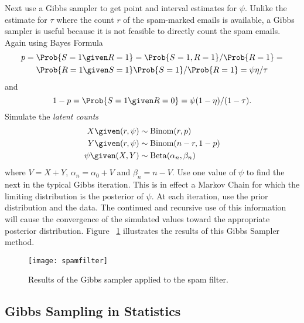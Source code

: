 \documentclass[12pt]{article}
\begin{document}
Next use a Gibbs sampler to get point and interval estimates for \( \psi
\).  Unlike the estimate for \( \tau \) where the count \( r \) of the
spam-marked emails is available, a Gibbs sampler is useful because it is
not feasible to directly count the spam emails.  Again using Bayes
Formula
\begin{multline*}
    p = \Prob{S=1 \given R = 1} = \Prob{S=1, R = 1}/\Prob{R = 1} = \\
    \Prob{R = 1 \given S=1} \Prob{S = 1}/\Prob{R = 1} = \psi\eta/\tau
\end{multline*}
and
\[
    1 - p = \Prob{S=1 \given R = 0} = \psi(1-\eta)/(1-\tau).
\] Simulate the \emph{latent counts}
\begin{align*}
    X \given (r,\psi) &\sim
    \operatorname{Binom}
    (r, p) \\
    Y \given (r,\psi) &\sim
    \operatorname{Binom}
    (n-r, 1-p) \\
    \psi \given (X,Y) &\sim
    \operatorname{Beta}
    (\alpha_n, \beta_n) \\
\end{align*}
where \( V = X + Y \), \( \alpha_n = \alpha_0 + V \) and \( \beta_n = n
- V \). Use one value of \( \psi \) to find the next in the typical
Gibbs iteration.  This is in effect a Markov Chain for which the
limiting distribution is the posterior of \( \psi \).  At each
iteration, use the prior distribution and the data.  The continued and
recursive use of this information will cause the convergence of the
simulated values toward the appropriate posterior distribution.  Figure~%
\ref{fig:gibbsampler:spamfilter} illustrates the results of this Gibbs
Sampler method.

\begin{figure}
    \centering
    \texttt{[image: spamfilter]}
    \caption{Results of the Gibbs sampler applied to the spam filter.}%
    \label{fig:gibbsampler:spamfilter}
\end{figure}

\subsection*{Gibbs Sampling in Statistics}
\end{document}
